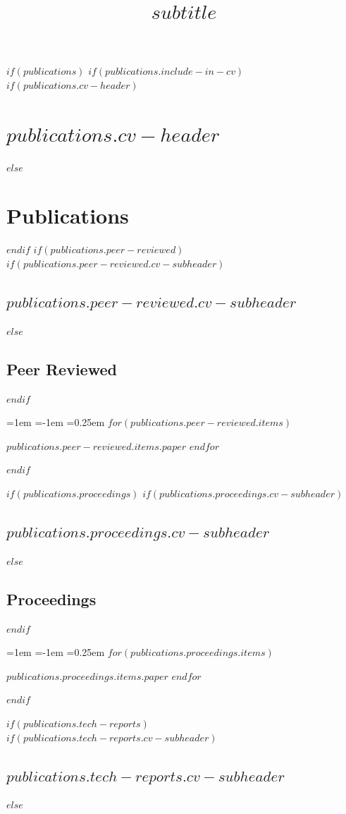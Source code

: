 \documentclass[letterpaper,10pt,final]{moderncv}
\title{$subtitle$}
\begin{document}
\normalsize
\makecvtitle

$if(publications)$
$if(publications.include-in-cv)$
$if(publications.cv-header)$
\section{$publications.cv-header$}
$else$
\section{Publications}
$endif$
$if(publications.peer-reviewed)$
$if(publications.peer-reviewed.cv-subheader)$
\subsection{$publications.peer-reviewed.cv-subheader$}
$else$
\subsection{Peer Reviewed}
$endif$
\vspace*{0.25em}
\begin{list}{}{\leftmargin=1em \itemindent=-1em \itemsep=0.25em}
$for(publications.peer-reviewed.items)$
\item $publications.peer-reviewed.items.paper$
$endfor$
\end{list}
$endif$

$if(publications.proceedings)$
$if(publications.proceedings.cv-subheader)$
\subsection{$publications.proceedings.cv-subheader$}
$else$
\subsection{Proceedings}
$endif$
\vspace*{0.25em}
\begin{list}{}{\leftmargin=1em \itemindent=-1em \itemsep=0.25em}
$for(publications.proceedings.items)$
\item $publications.proceedings.items.paper$
$endfor$
\end{list}
$endif$

$if(publications.tech-reports)$
$if(publications.tech-reports.cv-subheader)$
\subsection{$publications.tech-reports.cv-subheader$}
$else$
\end{document}
